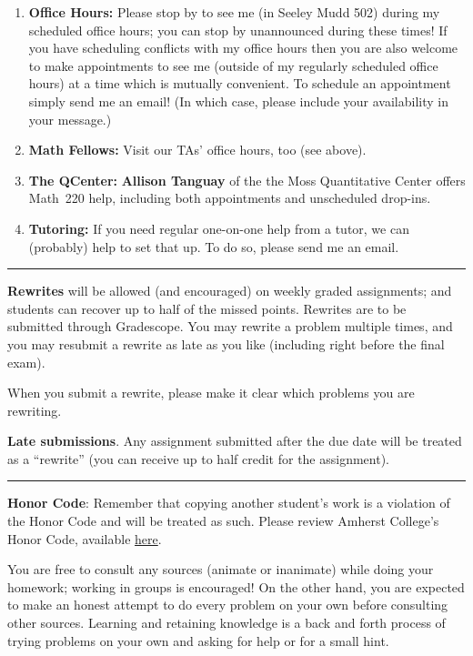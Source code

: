 \documentclass[12pt]{article}
\begin{document}
\begin{enumerate}
\item[]{\bf Office Hours:} Please stop by to see me (in Seeley Mudd 502) during my scheduled office hours; you can stop by unannounced during these times! If you have scheduling conflicts with my office hours then you are also welcome to make appointments to see me (outside of my regularly scheduled office hours) at a time which is mutually convenient. To schedule an appointment simply send me an email! (In which case, please include your availability in your message.)
\item[] {\bf Math Fellows:} Visit our TAs' office hours, too (see above).
\item[] {\bf The QCenter:} \textbf{Allison Tanguay} of the the Moss Quantitative Center offers Math~220 help, including both appointments and unscheduled drop-ins.
\item[] {\bf Tutoring:} If you need regular one-on-one help from a tutor, we can (probably) help to set that up. To do so, please send me an email.
\end{enumerate}

\smallskip \hrule \medskip

\noindent\textbf{Rewrites} will be allowed (and encouraged) on weekly graded assignments;
 and students can recover up to half of the missed points. Rewrites
 are to be submitted through Gradescope. You may rewrite a problem
 multiple times, and you may resubmit a rewrite as late as you like
 (including right before the final exam).

\medskip

\noindent When you submit a rewrite, please make it clear which problems you are rewriting.

\bigskip
\noindent\textbf{Late submissions}. Any assignment submitted after the due date will be treated as a ``rewrite'' (you can receive up to half credit for the assignment).

\smallskip \hrule \medskip

\noindent\textbf{Honor Code}: Remember that copying another student's work is a violation of the Honor Code and will be treated as such. Please review Amherst College's Honor Code, available \href{https://www.amherst.edu/offices/student-affairs/community-standards/college-standards/honor-code}{here}.

You are free to consult any sources (animate or inanimate) while doing your homework; working in groups is encouraged! %
On the other hand, you are expected to make an honest attempt to do every problem on your own before consulting other sources. Learning and retaining knowledge is a back and forth process of trying problems on your own and asking for help or for a small hint.
\end{document}
